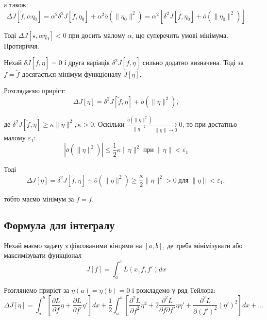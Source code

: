\documentclass[14pt]{extarticle}
\newcommand{\<}{\langle}
\renewcommand{\>}{\rangle}
\theoremstyle{mystyle}{\newtheorem{definition}{Definition}[section]}
\theoremstyle{mystyle}{\newtheorem{proposition}[definition]{Proposition}}
\theoremstyle{mystyle}{\newtheorem{theorem}[definition]{Theorem}}
\theoremstyle{mystyle}{\newtheorem{lemma}[definition]{Lemma}}
\theoremstyle{mystyle}{\newtheorem{corollary}[definition]{Corollary}}
\theoremstyle{mystyle}{\newtheorem*{remark}{Remark}}
\theoremstyle{mystyle}{\newtheorem*{remarks}{Remarks}}
\theoremstyle{mystyle}{\newtheorem*{example}{Example}}
\theoremstyle{mystyle}{\newtheorem*{examples}{Examples}}
\theoremstyle{definition}{\newtheorem*{exercise}{Exercise}}
\theoremstyle{cstyle}{\newtheorem*{cthm}{}}
\theoremstyle{warn}
\begin{document}
а також:
\begin{equation}
    \Delta J[\widetilde{f}, \alpha\eta_0] = \alpha^2\delta^2 J[\widetilde{f},\eta_0] + \alpha^2 \overline{o}(\|\eta_0\|^2) = \alpha^2\left[\delta^2 J[\widetilde{f},\eta_0]+\overline{o}(\|\eta_0\|^2)\right]
\end{equation}

Тоді $\Delta J[\star,\alpha \eta_0]<0$ при досить малому $\alpha$, що суперечить умові мінімума. Протиріччя.

\begin{theorem}
    Нехай $\delta J[\widetilde{f},\eta]=0$ і друга варіація $\delta^2 J[\widetilde{f},\eta]$ сильно додатно визначена. Тоді за $f=\widetilde{f}$ досягається мінімум функціоналу $J[\eta]$.
\end{theorem}

Розглядаємо приріст:
\begin{equation}
    \Delta J[\eta] = \delta^2 J[\widetilde{f},\eta] + \overline{o}(\|\eta\|^2),
\end{equation}

де $\delta^2 J[\widetilde{f},\eta] \geq \kappa\|\eta\|^2,\kappa>0$. Оскільки $\frac{\overline{o}(\|\eta\|^2)}{\|\eta\|^2} \xrightarrow[\|\eta\| \to 0]{} 0$, то при достатньо малому $\varepsilon_1$:
\begin{equation}
    |\overline{o}(\|\eta\|^2)| \leq \frac{1}{2}\kappa \|\eta\|^2 \; \text{при} \; \|\eta\| < \varepsilon_1
\end{equation}

Тоді
\begin{equation}
    \Delta J[\eta] = \delta^2 J[\widetilde{f},\eta] + \overline{o}(\|\eta\|^2) \geq \frac{\kappa}{2}\|\eta\|^2 > 0 \; \text{для} \; \|\eta\|<\varepsilon_1,
\end{equation}

тобто маємо мінімум за $f=\widetilde{f}$. 

\subsection{Формула для інтегралу}
Нехай маємо задачу з фіксованими кінцями на $[a,b]$, де треба мінімізувати або максимізувати функціонал 
\begin{equation}
    J[f] = \int_a^b L(x,f,f')dx
\end{equation}

Розглянемо приріст за $\eta(a)=\eta(b)=0$ і розкладемо у ряд Тейлора:
\begin{equation}
    \Delta J[\eta] = \int_a^b\left[\frac{\partial L}{\partial f}\eta + \frac{\partial L}{\partial f'}\eta'\right]dx + \frac{1}{2}\int_a^b\left[\frac{\partial^2 L}{\partial f^2}\eta^2 + 2\frac{\partial^2 L}{\partial f\partial f'}\eta\eta' + \frac{\partial^2 L}{\partial (f')^2}(\eta')^2\right]dx + \dots
\end{equation}
\end{document}
